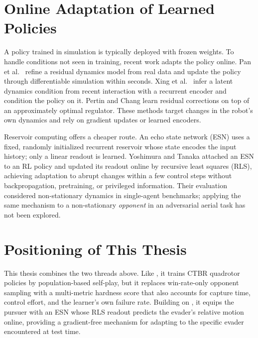 \section{Online Adaptation of Learned Policies}
\noindent
A policy trained in simulation is typically deployed with frozen weights. To handle conditions not seen in training, recent work adapts the policy online. Pan et al.\ \cite{panLearningFlyRapid2026} refine a residual dynamics model from real data and update the policy through differentiable simulation within seconds. Xing et al.\ \cite{xingContinualRobotPolicy2026} infer a latent dynamics condition from recent interaction with a recurrent encoder and condition the policy on it. Pertin and Chang \cite{pertinNSTRLResidualReinforcement2026} learn residual corrections on top of an approximately optimal regulator. These methods target changes in the robot's own dynamics and rely on gradient updates or learned encoders.

Reservoir computing offers a cheaper route. An echo state network (ESN) uses a fixed, randomly initialized recurrent reservoir whose state encodes the input history; only a linear readout is learned. Yoshimura and Tanaka \cite{yoshimuraOnlineAdaptiveReinforcement2026} attached an ESN to an RL policy and updated its readout online by recursive least squares (RLS), achieving adaptation to abrupt changes within a few control steps without backpropagation, pretraining, or privileged information. Their evaluation considered non-stationary dynamics in single-agent benchmarks; applying the same mechanism to a non-stationary \emph{opponent} in an adversarial aerial task has not been explored.

\section{Positioning of This Thesis}
\noindent
This thesis combines the two threads above. Like \cite{ronceroLearnedControllersAgile2026, tangAgilePEAutonomousUAV2026a, gavinInterceptingAgileTarget2026}, it trains CTBR quadrotor policies by population-based self-play, but it replaces win-rate-only opponent sampling with a multi-metric hardness score that also accounts for capture time, control effort, and the learner's own failure rate. Building on \cite{yoshimuraOnlineAdaptiveReinforcement2026}, it equips the pursuer with an ESN whose RLS readout predicts the evader's relative motion online, providing a gradient-free mechanism for adapting to the specific evader encountered at test time.

